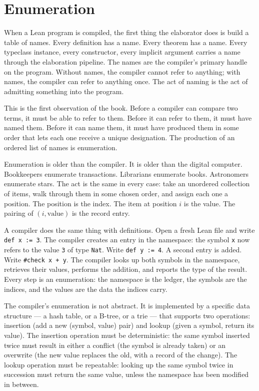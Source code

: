 \chapter{Enumeration}
\label{chap:enumeration}


\begin{chapteressay}

When a Lean program is compiled, the first thing the elaborator does is
build a table of names. Every definition has a name. Every theorem has a
name. Every typeclass instance, every constructor, every implicit argument
carries a name through the elaboration pipeline. The names are the
compiler's primary handle on the program. Without names, the compiler
cannot refer to anything; with names, the compiler can refer to anything
once. The act of naming is the act of admitting something into the
program.

This is the first observation of the book. Before a compiler can compare
two terms, it must be able to refer to them. Before it can refer to them,
it must have named them. Before it can name them, it must have produced
them in some order that lets each one receive a unique designation. The
production of an ordered list of names is enumeration.

Enumeration is older than the compiler. It is older than the digital
computer. Bookkeepers enumerate transactions. Librarians enumerate books.
Astronomers enumerate stars. The act is the same in every case: take an
unordered collection of items, walk through them in some chosen order, and
assign each one a position. The position is the index. The item at
position $i$ is the value. The pairing of $(i, \text{value})$ is the
record entry.

A compiler does the same thing with definitions. Open a fresh Lean file
and write \texttt{def x := 3}. The compiler creates an entry in the
namespace: the symbol \texttt{x} now refers to the value \texttt{3} of
type \texttt{Nat}. Write \texttt{def y := 4}. A second entry is added.
Write \texttt{\#check x + y}. The compiler looks up both symbols in the
namespace, retrieves their values, performs the addition, and reports the
type of the result. Every step is an enumeration: the namespace is the
ledger, the symbols are the indices, and the values are the data the
indices carry.

The compiler's enumeration is not abstract. It is implemented by a
specific data structure --- a hash table, or a B-tree, or a trie --- that
supports two operations: insertion (add a new (symbol, value) pair) and
lookup (given a symbol, return its value). The insertion operation must be
deterministic: the same symbol inserted twice must result in either a
conflict (the symbol is already taken) or an overwrite (the new value
replaces the old, with a record of the change). The lookup operation must
be repeatable: looking up the same symbol twice in succession must return
the same value, unless the namespace has been modified in between.


\end{chapteressay}
